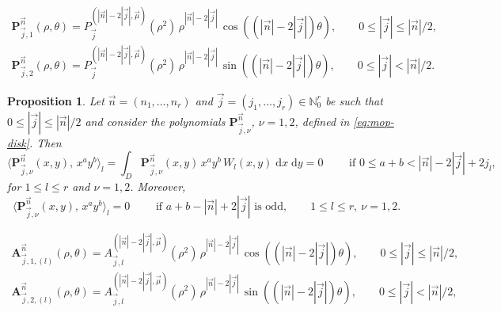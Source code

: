 \documentclass[10pt,a4paper]{amsart}
\newtheorem{proposition}{Proposition}
\newcommand{\NN}{\mathbb{N}}
\newcommand{\dxdy}{\;\mathrm{d} x\;\mathrm{d} y}
\begin{document}
        \begin{equation}
        \label{eq:mop-disk}
            \begin{array}{c}
            \mathbf P_{\vec j,1}^{\vec n}(\rho,\theta) =P^{(|\vec n|-2|\vec j|, \vec \mu)}_{\vec j}(\rho^2)\, \rho^{|\vec n|-2|\vec j|}\,\cos((|\vec n|-2|\vec j|)\theta), \qquad 0\leq |\vec j| \leq |\vec n|/2,
            \\[2ex]
            \mathbf P_{\vec j,2}^{\vec n}(\rho,\theta) = P^{(|\vec n|-2|\vec j|, \vec \mu)}_{\vec j}(\rho^2)\, \rho^{|\vec n|-2|\vec j|}\,\sin((|\vec n|-2|\vec j|)\theta), \qquad 0\leq |\vec j|< |\vec n|/2.
            \end{array}
        \end{equation}

    \begin{proposition}\label{prop:orthogonality-2-vars}
        Let $\vec n = (n_1,\dots,n_r)$ and $\vec j = (j_1,\dots,j_r)\in\NN_0^r$ be such that  $0\leq |\vec j| \leq |\vec n|/2$ and consider the polynomials $\mathbf P_{\vec j,\nu}^{\vec n}$, $\nu=1,2$, defined in \eqref{eq:mop-disk}. Then
        \begin{equation}
        \label{eq:multiple-orthogonality-disk}
            \langle\mathbf P_{\vec j,\nu}^{\vec n}(x,y),\, x^a y^b\rangle_l=\int_D \mathbf P_{\vec j,\nu}^{\vec n}(x,y)\, x^a y^b \, W_l(x,y)\dxdy =0 \qquad \text{ if }0\leq a+b< |\vec n|-2|\vec j| + 2j_l,
        \end{equation}
        for $1\leq l\leq r$ and $\nu =1,2$. Moreover, 
        $$
        \langle\mathbf P_{\vec j,\nu}^{\vec n}(x,y),\, x^a y^b\rangle_l=0 \qquad\text{ if }a+b - |\vec n|+ 2|\vec j|\text{ is odd}, \qquad 1\leq l\leq r,  \ \nu =1,2.
        $$
    \end{proposition}

        \begin{equation}
            \label{eq:Type-I-MOP-2-vars}
            \begin{aligned}
                \mathbf A_{\vec j,1,(l)}^{\vec n}(\rho,\theta)= A^{(|\vec n|-2|\vec j|, \vec \mu)}_{\vec j,l}(\rho^2)\, \rho^{|\vec n|-2|\vec j|}\, \cos((|\vec n|-2|\vec j|)\theta), \qquad 0\leq |\vec j| \leq |\vec n|/2,\\
                \mathbf A_{\vec j,2,(l)}^{\vec n}(\rho,\theta)= A^{(|\vec n|-2|\vec j|, \vec \mu)}_{\vec j,l}(\rho^2)\, \rho^{|\vec n|-2|\vec j|}\, \sin((|\vec n|-2|\vec j|)\theta), \qquad 0\leq |\vec j| < |\vec n|/2,\\
            \end{aligned}
        \end{equation}
\end{document}
